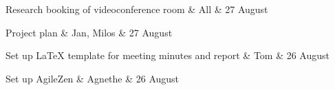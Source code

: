 \nextItem
Research booking of videoconference room &
All &
27 August


\nextItem
Project plan &
Jan, Milos &
27 August


\nextItem
Set up LaTeX template for meeting minutes and report &
Tom &
26 August


\nextItem
Set up AgileZen &
Agnethe &
26 August
